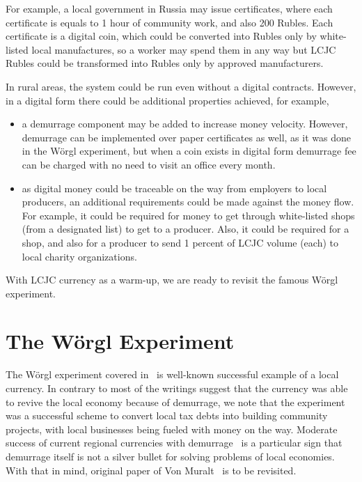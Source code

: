 \documentclass[]{llncs}   %
\begin{document}
For example, a local government in Russia may issue certificates, where each certificate is equals to 1 hour of community work, and also 200 Rubles. Each certificate is a digital coin, which could be converted into Rubles only by white-listed local manufactures, so a worker may spend them in any way but LCJC Rubles could be transformed into Rubles only by approved manufacturers.

In rural areas, the system could be run even without a digital contracts. However, in a digital form there could be
additional properties achieved, for example,
    \begin{itemize}
        \item{} a demurrage component may be added to increase money velocity. However, demurrage can be implemented over paper 
        certificates as well, as it was done in the W\"{o}rgl experiment, but when a coin exists in digital form 
         demurrage fee can be charged with no need to visit an office every month.
        \item{} as digital money could be traceable on the way from employers to local producers, an additional
        requirements could be made against the money flow. For example, it could be required for money to get through
        white-listed shops (from a designated list) to get to a producer. Also, it could be required for a shop, and also for a
        producer to send 1 percent of LCJC volume (each) to local charity organizations.
    \end{itemize}


With LCJC currency as a warm-up, we are ready to revisit the famous W\"{o}rgl experiment.

\section{The W\"{o}rgl Experiment}
\label{sec-worgl}

The W\"{o}rgl experiment covered in~\cite{muralt1934woergl} is well-known successful example of a local currency. In
contrary to most of the writings suggest that the currency was able to revive the local economy because of demurrage, we
 note that the experiment was a successful scheme to convert local tax debts into building community projects, with
 local businesses being fueled with money on the way. Moderate success of current regional currencies with demurrage~\cite{thiel2011complementary} is a particular sign that demurrage itself is not a silver bullet for solving problems of local economies.
 With that in mind, original paper of Von Muralt~\cite{muralt1934woergl} is to be revisited. 
\end{document}
